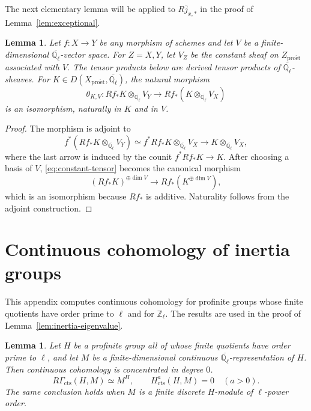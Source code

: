 \documentclass[12pt,reqno]{amsart}
\theoremstyle{definition}
\theoremstyle{plain}
\newtheorem{lem}[para]{Lemma}
\theoremstyle{definition}
\theoremstyle{remark}
\newcommand{\bbQ}{\mathbb{Q}}  \newcommand{\bbR}{\mathbb{R}}
\newcommand{\ol}[1]{\overline{#1}}
\newcommand{\Ql}{\bbQ_{\ell}}
\begin{document}
The next elementary lemma will be applied to \(R\bar j_{x,*}\) in the proof of
Lemma~\ref{lem:exceptional}.

\begin{lem}
\label{lem:constant-tensor}
Let \(f\colon X\to Y\) be any morphism of schemes and let \(V\) be a finite-dimensional
\(\ol\Ql\)-vector space.  For \(Z=X,Y\), let \(V_Z\) be the constant sheaf on
\(Z_{\mathrm{pro\acute et}}\) associated with \(V\).  The tensor products below are derived tensor
products of \(\ol\Ql\)-sheaves.  For \(K\in D(X_{\mathrm{pro\acute et}},\ol\Ql)\), the natural morphism
\begin{equation}
\label{eq:constant-tensor}
        \theta_{K,V}\colon
        Rf_*K\otimes_{\ol\Ql}V_Y
        \longrightarrow
        Rf_*(K\otimes_{\ol\Ql}V_X)
\end{equation}
is an isomorphism, naturally in \(K\) and in \(V\).
\end{lem}

\begin{proof}
The morphism is adjoint to
\[
 f^*(Rf_*K\otimes_{\ol\Ql}V_Y)
 \simeq f^*Rf_*K\otimes_{\ol\Ql}V_X
 \longrightarrow K\otimes_{\ol\Ql}V_X,
\]
where the last arrow is induced by the counit \(f^*Rf_*K\to K\).  After choosing a basis of \(V\),
\eqref{eq:constant-tensor} becomes the canonical morphism
\[
        (Rf_*K)^{\oplus\dim V}\longrightarrow Rf_*(K^{\oplus\dim V}),
\]
which is an isomorphism because \(Rf_*\) is additive.  Naturality follows from the adjoint
construction.
\end{proof}

\section{Continuous cohomology of inertia groups}
\label{app:boundary}

This appendix computes continuous cohomology for profinite groups whose finite quotients have order
prime to \(\ell\) and for \(\mathbb Z_\ell\).  The results are used in the proof of
Lemma~\ref{lem:inertia-eigenvalue}.

\begin{lem}
\label{lem:prime-to-ell-vanishing}
Let \(H\) be a profinite group all of whose finite quotients have order prime to \(\ell\), and let \(M\)
be a finite-dimensional continuous \(\ol\Ql\)-representation of \(H\).  Then continuous cohomology is
concentrated in degree \(0\).
\[
        R\Gamma_{\mathrm{cts}}(H,M)\simeq M^H,
        \qquad
        H^a_{\mathrm{cts}}(H,M)=0\quad(a>0).
\]
The same conclusion holds when \(M\) is a finite discrete \(H\)-module of \(\ell\)-power order.
\end{lem}
\end{document}
